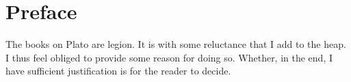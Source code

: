 \chapter*{Preface} %
\label{cha:preface}

The books on Plato are legion. It is with some reluctance that I add to the heap. I thus feel obliged to provide some reason for doing so. Whether, in the end, I have sufficient justification is for the reader to decide.

